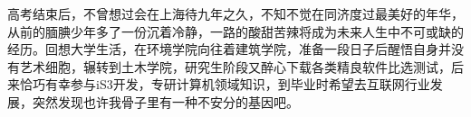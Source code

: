 \begin{ack}\fs
高考结束后，不曾想过会在上海待九年之久，不知不觉在同济度过最美好的年华，从前的腼腆少年多了一份沉着冷静，一路的酸甜苦辣将成为未来人生中不可或缺的经历。回想大学生活，在环境学院向往着建筑学院，准备一段日子后醒悟自身并没有艺术细胞，辗转到土木学院，研究生阶段又醉心下载各类精良软件比选测试，后来恰巧有幸参与iS3开发，专研计算机领域知识，到毕业时希望去互联网行业发展，突然发现也许我骨子里有一种不安分的基因吧。

\end{ack}